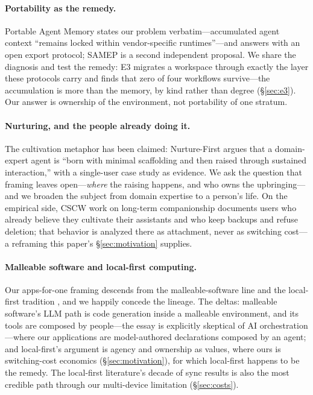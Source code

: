 \documentclass[11pt]{article}
\begin{document}
\paragraph{Portability as the remedy.}
Portable Agent Memory \citep{portable-agent-memory} states our problem
verbatim---accumulated agent context ``remains locked within vendor-specific
runtimes''---and answers with an open export protocol; SAMEP \citep{samep} is a
second independent proposal. We share the diagnosis and test the remedy: E3
migrates a workspace through exactly the layer these protocols carry and finds
that zero of four workflows survive---the accumulation is more than the memory,
by kind rather than degree (\S\ref{sec:e3}). Our answer is ownership of the
environment, not portability of one stratum.

\paragraph{Nurturing, and the people already doing it.}
The cultivation metaphor has been claimed: Nurture-First \citep{nurture-first}
argues that a domain-expert agent is ``born with minimal scaffolding and then
raised through sustained interaction,'' with a single-user case study as
evidence. We ask the question that framing leaves open---\emph{where} the raising
happens, and who owns the upbringing---and we broaden the subject from domain
expertise to a person's life. On the empirical side, CSCW work on long-term
companionship \citep{digital-companionship} documents users who already believe
they cultivate their assistants and who keep backups and refuse deletion; that
behavior is analyzed there as attachment, never as switching cost---a reframing
this paper's \S\ref{sec:motivation} supplies.

\paragraph{Malleable software and local-first computing.}
Our apps-for-one framing descends from the malleable-software line
\citep{malleable-software,home-cooked-app} and the local-first tradition
\citep{local-first}, and we happily concede the lineage. The deltas: malleable
software's LLM path is code generation inside a malleable environment, and its
tools are composed by people---the essay is explicitly skeptical of AI
orchestration---where our applications are model-authored declarations composed
by an agent; and local-first's argument is agency and ownership as values, where
ours is switching-cost economics (\S\ref{sec:motivation}), for which local-first
happens to be the remedy. The local-first literature's decade of sync results is
also the most credible path through our multi-device limitation
(\S\ref{sec:costs}).
\end{document}
